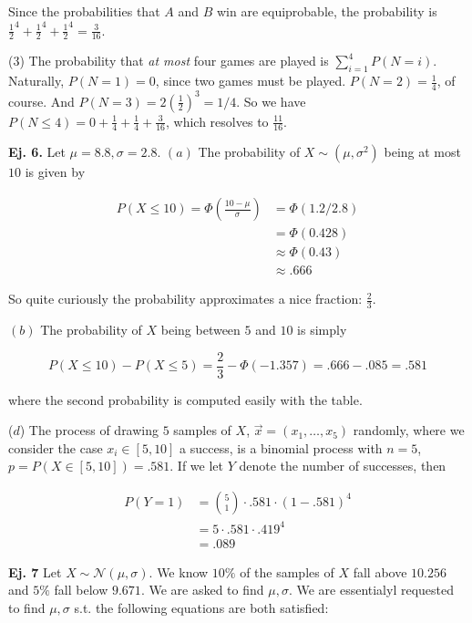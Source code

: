 \documentclass[a4paper, 12pt]{article}
\begin{document}
Since the probabilities that $A$ and $B$ win are equiprobable, the probability
is $\frac{1}{2}^{4} + \frac{1}{2}^4 + \frac{1}{2}^4 = \frac{3}{16}$.

(3) The probability that \textit{at most} four games are played is
$\sum_{i=1}^{4} P(N = i)$. Naturally, $P(N=1) = 0$, since two games must be
played. $P(N = 2) = \frac{1}{4}$, of course. And $P(N = 3) = 2 (\frac{1}{2})^3
= 1/4$. So we have $P(N \leq 4) = 0 + \frac{1}{4} + \frac{1}{4} +
\frac{3}{16}$, which resolves to $\frac{11}{16}$.


\pagebreak 

\textbf{Ej. 6.}  Let $\mu=8.8, \sigma=2.8$. $(a)$ The probability of $X \sim (\mu, \sigma^2)$ being 
at most $10$ is given by 

\begin{align*}
    P(X \leq 10) = \Phi( \frac{10 - \mu}{\sigma}) &= \Phi(1.2 / 2.8) \\ 
                                   &= \Phi(0.428) \\ 
                                   &\approx \Phi(0.43) \\ 
                                   &\approx .666
\end{align*}

So quite curiously the probability approximates a nice fraction: $\frac{2}{3}$.

$(b)$ The probability of $X$ being between $5$ and $10$ is simply 

\begin{equation*}
    P(X \leq 10) - P(X \leq 5) = \frac{2}{3} - \Phi(-1.357) = .666 - .085 = .581
\end{equation*}

where the second probability is computed easily with the table.

($d$) The process of drawing $5$ samples of $X$, $\overrightarrow{x} = (x_1,
\ldots, x_5)$ randomly, where we consider the case $x_i \in [5, 10]$ a success,
is a binomial process with $n = 5$, $p = P(X \in [5, 10]) = .581$.
If we let $Y$ denote the number of successes, then

\begin{align*}
    P(Y = 1) &= \binom{5}{1} \cdot .581 \cdot (1 - .581)^{4} \\ 
    &= 5 \cdot .581 \cdot .419^4 \\ 
    &= .089
\end{align*}

\pagebreak 

\textbf{Ej. 7} Let $X \sim \mathcal{N}(\mu, \sigma)$. We know $10\%$ of the
samples of $X$ fall above $10.256$ and $5\%$ fall below $9.671$. 
We are asked to find $\mu, \sigma$. We are essentialyl 
requested to find $\mu, \sigma$ s.t. the following 
equations are both satisfied:
\end{document}
